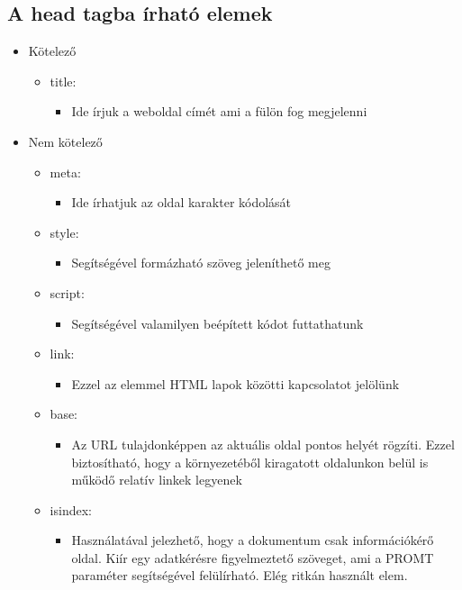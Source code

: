 \documentclass[12pt,twoside]{report}
\theoremstyle{definition}
\begin{document}
\subsection{A head tagba írható elemek}
\begin{itemize}
	\item Kötelező
	\begin{itemize}
		\item title:
		\begin{itemize}
			\item Ide írjuk a weboldal  címét ami a fülön fog megjelenni
		\end{itemize}
	\end{itemize}
	\item Nem kötelező
	\begin{itemize}
		\item meta:
		\begin{itemize}
			\item Ide írhatjuk az oldal karakter kódolását
		\end{itemize}
	\item style:
	\begin{itemize}
		\item Segítségével formázható szöveg jeleníthető meg
	\end{itemize}
	\item script:
	\begin{itemize}
		\item Segítségével valamilyen beépített kódot futtathatunk
	\end{itemize}
	\item link:
	\begin{itemize}
		\item Ezzel az elemmel HTML lapok közötti kapcsolatot jelölünk
	\end{itemize}
	\item base:
	\begin{itemize}
		\item Az URL tulajdonképpen az aktuális oldal pontos helyét rögzíti. Ezzel biztosítható, hogy a környezetéből kiragatott oldalunkon belül is működő relatív linkek legyenek
	\end{itemize}
	\item isindex:
	\begin{itemize}
		\item Használatával jelezhető, hogy a dokumentum csak információkérő oldal. Kiír egy adatkérésre figyelmeztető szöveget, ami a PROMT paraméter segítségével felülírható. Elég ritkán használt elem.
	\end{itemize}
	\end{itemize}
\end{itemize}
\end{document}
